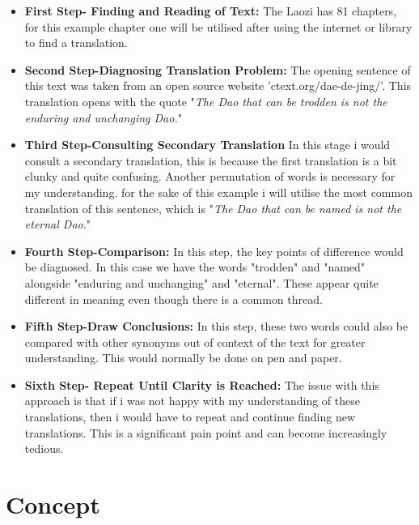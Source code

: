\documentclass{article}
\begin{document}
\begin{itemize}

\item{\textbf{First Step- Finding and Reading of Text:} The Laozi has 81 chapters, for this example chapter one will be utilised after using the internet or library to find a translation.}
\item{\textbf{Second Step-Diagnosing Translation Problem:} The opening sentence of this text was taken from an open source website 'ctext.org/dae-de-jing/'. This translation opens with the quote "\textit{The Dao that can be trodden is not the enduring and unchanging Dao.}"}

\item{\textbf{Third Step-Consulting Secondary Translation} In this stage i would consult a secondary translation, this is because the first translation is a bit clunky and quite confusing. Another permutation of words is necessary for my understanding. for the sake of this example i will utilise the most common translation of this sentence, which is "\textit{The Dao that can be named is not the eternal Dao}."}
\item{\textbf{Fourth Step-Comparison:} In this step, the key points of difference would be diagnosed. In this case we have the words "trodden" and "named" alongside "enduring and unchanging" and "eternal". These appear quite different in meaning even though there is a common thread.}
\item{\textbf{Fifth Step-Draw Conclusions:} In this step, these two words could also be compared with other synonyms out of context of the text for greater understanding. This would normally be done on pen and paper.}
\item{\textbf{Sixth Step- Repeat Until Clarity is Reached:} The issue with this approach is that if i was not happy with my understanding of these translations, then i would have to repeat and continue finding new translations. This is a significant pain point and can become increasingly tedious.}


\end{itemize}



\section{Concept}
\end{document}
